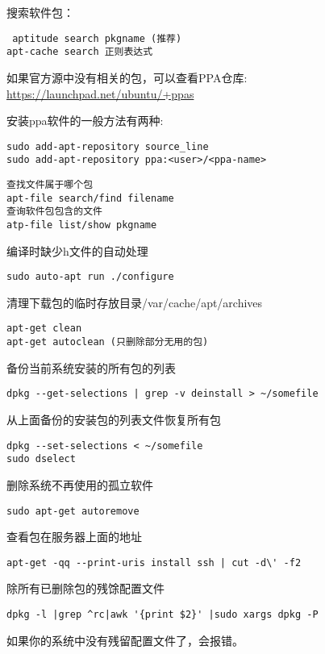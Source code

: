搜索软件包：
\begin{verbatim}
 aptitude search pkgname (推荐)
apt-cache search 正则表达式
\end{verbatim}

如果官方源中没有相关的包，可以查看PPA仓库:
\url{https://launchpad.net/ubuntu/+ppas}

安装ppa软件的一般方法有两种:
\begin{verbatim}
sudo add-apt-repository source_line
sudo add-apt-repository ppa:<user>/<ppa-name>
\end{verbatim}

\begin{verbatim}
查找文件属于哪个包
apt-file search/find filename
查询软件包包含的文件
atp-file list/show pkgname
\end{verbatim}

编译时缺少h文件的自动处理
\begin{verbatim}
sudo auto-apt run ./configure
\end{verbatim}

清理下载包的临时存放目录/var/cache/apt/archives
\begin{verbatim}
apt-get clean
apt-get autoclean (只删除部分无用的包)
\end{verbatim}

备份当前系统安装的所有包的列表
\begin{verbatim}
dpkg --get-selections | grep -v deinstall > ~/somefile
\end{verbatim}

从上面备份的安装包的列表文件恢复所有包
\begin{verbatim}
dpkg --set-selections < ~/somefile
sudo dselect
\end{verbatim}

删除系统不再使用的孤立软件
\begin{verbatim}
sudo apt-get autoremove
\end{verbatim}

查看包在服务器上面的地址
\begin{verbatim}
apt-get -qq --print-uris install ssh | cut -d\' -f2
\end{verbatim}

除所有已删除包的残馀配置文件
\begin{verbatim}
dpkg -l |grep ^rc|awk '{print $2}' |sudo xargs dpkg -P 
\end{verbatim}
如果你的系统中没有残留配置文件了，会报错。

